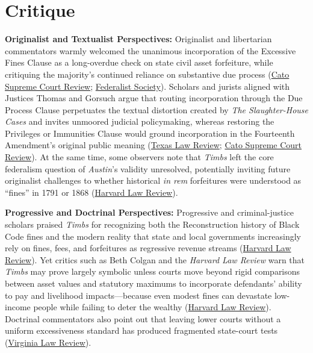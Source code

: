 \documentclass[12pt]{article}
\begin{document}
\section{Critique}

\textbf{Originalist and Textualist Perspectives:} Originalist and libertarian commentators warmly welcomed the unanimous incorporation of the Excessive Fines Clause as a long-overdue check on state civil asset forfeiture, while critiquing the majority's continued reliance on substantive due process (\href{https://www.cato.org/supreme-court-review/2018-2019/timbs-v-indiana-mere-constitutional-housekeeping-or-timely-revival}{Cato Supreme Court Review}; \href{https://fedsoc.org/case/timbs-v-indiana}{Federalist Society}). Scholars and jurists aligned with Justices Thomas and Gorsuch argue that routing incorporation through the Due Process Clause perpetuates the textual distortion created by \textit{The Slaughter-House Cases} and invites unmoored judicial policymaking, whereas restoring the Privileges or Immunities Clause would ground incorporation in the Fourteenth Amendment's original public meaning (\href{https://texaslawreview.org/a-distinction-with-a-difference/}{Texas Law Review}; \href{https://www.cato.org/supreme-court-review/2018-2019/timbs-v-indiana-mere-constitutional-housekeeping-or-timely-revival}{Cato Supreme Court Review}). At the same time, some observers note that \textit{Timbs} left the core federalism question of \textit{Austin}'s validity unresolved, potentially inviting future originalist challenges to whether historical \textit{in rem} forfeitures were understood as ``fines'' in 1791 or 1868 (\href{https://harvardlawreview.org/print/vol-133/timbs-v-indiana/}{Harvard Law Review}).

\textbf{Progressive and Doctrinal Perspectives:} Progressive and criminal-justice scholars praised \textit{Timbs} for recognizing both the Reconstruction history of Black Code fines and the modern reality that state and local governments increasingly rely on fines, fees, and forfeitures as regressive revenue streams (\href{https://harvardlawreview.org/print/vol-133/timbs-v-indiana/}{Harvard Law Review}). Yet critics such as Beth Colgan and the \textit{Harvard Law Review} warn that \textit{Timbs} may prove largely symbolic unless courts move beyond rigid comparisons between asset values and statutory maximums to incorporate defendants' ability to pay and livelihood impacts---because even modest fines can devastate low-income people while failing to deter the wealthy (\href{https://harvardlawreview.org/print/vol-133/timbs-v-indiana/}{Harvard Law Review}). Doctrinal commentators also point out that leaving lower courts without a uniform excessiveness standard has produced fragmented state-court tests (\href{https://virginialawreview.org/wp-content/uploads/2025/03/Asbridge_Revised.pdf}{Virginia Law Review}).
\end{document}
